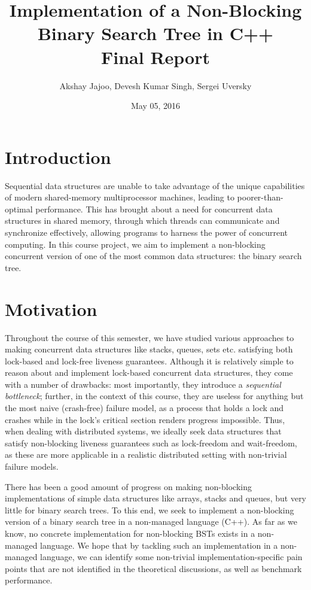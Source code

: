 \documentclass[10pt,pdftex,a4paper]{article}%
\begin{document}
\title{Implementation of a Non-Blocking Binary Search Tree in C++\\Final Report}
\author{Akshay Jajoo, Devesh Kumar Singh, Sergei Uversky}
\date{May 05, 2016}
\maketitle
\setcounter{page}{1}
\begin{multicols}{2}
\section{Introduction}
Sequential data structures are unable to take advantage of the unique capabilities of modern shared-memory multiprocessor machines, leading to poorer-than-optimal performance. This has brought about a need for concurrent data structures in shared memory, through which threads can communicate and synchronize effectively, allowing programs to harness the power of concurrent computing. \cite{shavit} In this course project, we aim to implement a non-blocking  concurrent version of one of the most common data structures: the binary search tree.

\section{Motivation}
Throughout the course of this semester, we have studied various approaches to making concurrent data structures like stacks, queues, sets etc. satisfying both lock-based and lock-free liveness guarantees.  Although it is relatively simple to reason about and implement lock-based concurrent data structures, they come with a number of drawbacks: most importantly, they introduce a \textit{sequential bottleneck}; further, in the context of this course, they are useless for anything but the most naive (crash-free) failure model, as a process that holds a lock and crashes while in the lock's critical section renders progress impossible.  Thus, when dealing with distributed systems, we ideally seek data structures that satisfy non-blocking liveness guarantees such as lock-freedom and wait-freedom, as these are more applicable in a realistic distributed setting with non-trivial failure models.

There has been a good amount of progress on making non-blocking implementations of simple data structures like arrays, stacks and queues, but very little for binary search trees. To this end, we seek to implement a non-blocking version of a binary search tree in a non-managed language (C++). As far as we know, no concrete implementation for non-blocking BSTs exists in a non-managed language.  We hope that by tackling such an implementation in a non-managed language, we can identify some non-trivial implementation-specific pain points that are not identified in the theoretical discussions, as well as benchmark performance. 


\end{multicols}
\end{document}
